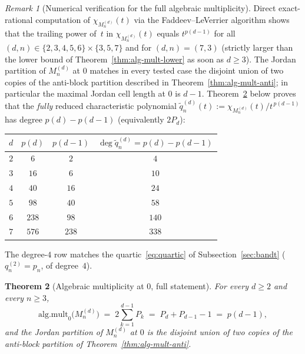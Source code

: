 \documentclass{amsart}
\newtheorem{theorem}{Theorem}[section]
\theoremstyle{definition}
\theoremstyle{remark}
\newtheorem{remark}[theorem]{Remark}
\begin{document}
\begin{remark}[Numerical verification for the full algebraic multiplicity]
\label{rem:alg-mult-verification}
Direct exact-rational computation of $\chi_{M_n^{(d)}}(t)$ via
the Faddeev--LeVerrier algorithm shows that the trailing power
of~$t$ in $\chi_{M_n^{(d)}}(t)$ equals $t^{p(d-1)}$ for all
$(d, n) \in \{2, 3, 4, 5, 6\} \times \{3, 5, 7\}$
and for $(d, n) = (7, 3)$ \textup{(}strictly larger than the
lower bound of Theorem~\ref{thm:alg-mult-lower} as soon as
$d \ge 3$\textup{)}.  The Jordan partition of $M_n^{(d)}$ at
$0$ matches in every tested case the disjoint union of two
copies of the anti-block partition described in
Theorem~\ref{thm:alg-mult-anti}; in particular the maximal
Jordan cell length at $0$ is $d - 1$.  Theorem~\ref{thm:alg-mult-sym}
below proves that the \emph{fully} reduced characteristic polynomial
$\widetilde q_n^{(d)}(t) := \chi_{M_n^{(d)}}(t) /
t^{\,p(d-1)}$ has degree $p(d) - p(d-1)$ \textup{(}equivalently
$2 P_d$\textup{)}:
\begin{center}\renewcommand{\arraystretch}{1.15}
\begin{tabular}{r@{\quad}c@{\quad}c@{\quad}c}
\toprule
$d$ & $p(d)$ & $p(d-1)$ & $\deg \widetilde q_n^{(d)}=p(d)-p(d-1)$ \\
\midrule
$2$ &   $6$ &   $2$ &   $4$ \\
$3$ &  $16$ &   $6$ &  $10$ \\
$4$ &  $40$ &  $16$ &  $24$ \\
$5$ &  $98$ &  $40$ &  $58$ \\
$6$ & $238$ &  $98$ & $140$ \\
$7$ & $576$ & $238$ & $338$ \\
\bottomrule
\end{tabular}
\end{center}
The degree-$4$ row matches the quartic~\eqref{eq:quartic} of
Subsection~\ref{sec:bandt} ($q_n^{(2)} = p_n$, of degree~$4$).
\end{remark}

\begin{theorem}[Algebraic multiplicity at $0$, full statement]
\label{thm:alg-mult-sym}
For every $d \ge 2$ and every $n \ge 3$,
\begin{equation}\label{eq:alg-mult-formula}
  \mathrm{alg.mult}_0\bigl(M_n^{(d)}\bigr)
  \;=\; 2 \sum_{k=1}^{d-1} P_k
  \;=\; P_d + P_{d-1} - 1 \;=\; p(d-1),
\end{equation}
and the Jordan partition of $M_n^{(d)}$ at $0$ is the disjoint
union of two copies of the anti-block partition of
Theorem~\ref{thm:alg-mult-anti}.
\end{theorem}
\end{document}

